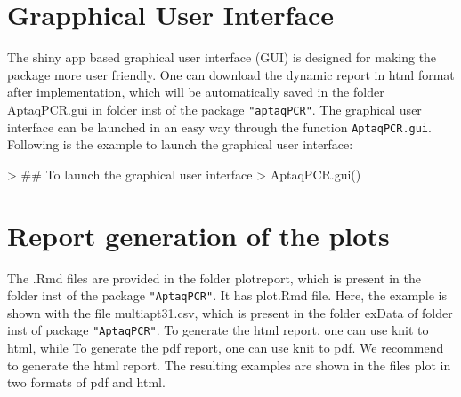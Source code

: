 \documentclass[11pt]{article}
\newcommand{\code}[1]{{\tt #1}}
\newcommand{\pkg}[1]{{\tt "#1"}}
\begin{document}
\section{Grapphical User Interface}
The shiny app based graphical user interface (GUI) is designed for making the package more user friendly. One can download the dynamic report in html format after implementation, which
will be automatically saved in the folder AptaqPCR.gui in folder inst of the package \pkg{aptaqPCR}. The graphical user interface can be launched in an easy way through the function \code{AptaqPCR.gui}.
Following is the example to launch the graphical user interface:

\begin{Schunk}
\begin{Sinput}
> ## To launch the graphical user interface
> AptaqPCR.gui()
\end{Sinput}
\end{Schunk}


\section{Report generation of the plots}
The .Rmd files are provided in the folder plotreport, which is present in the folder inst of the package \pkg{AptaqPCR}. It has  plot.Rmd file. Here, the example is shown with the file multiapt31.csv, which is present in the folder exData of folder inst of package \pkg{AptaqPCR}. To generate the html report, one can use knit to html, while To generate the pdf report, one can use knit to pdf. We recommend to generate the html report. The resulting examples are shown in the files plot in two formats of pdf and html.

\end{document}
